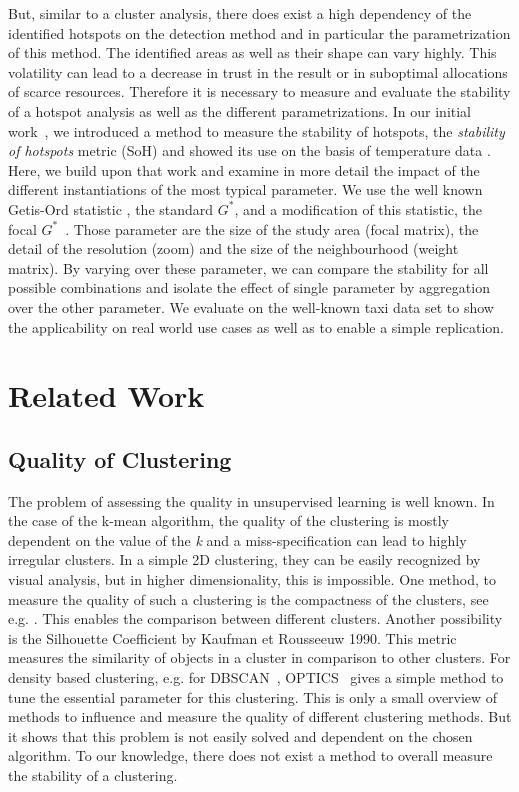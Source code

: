 \documentclass{itatnew}
\begin{document}
But, similar to a cluster analysis, there does exist a high dependency of the identified hotspots on the detection method and in particular the parametrization of this method. The identified areas as well as their shape can vary highly. This volatility can lead to a decrease in trust in the result or in suboptimal allocations of scarce resources. Therefore it is necessary to measure and evaluate the stability of a hotspot analysis as well as the different parametrizations. 
In our initial work~\cite{SoH-GI-Forum}, we introduced a method to measure the stability of hotspots, the \emph{stability of hotspots} metric (SoH) and showed its use on the basis of temperature data .   
Here, we build upon that work and examine in more detail the impact of the different instantiations of the most typical parameter. We use the well known Getis-Ord statistic \cite{Ord.1995}, the standard $G^*$, and a modification of this statistic, the focal $G^*$~\cite{SoH-GI-Forum}. Those parameter are the size of the study area (focal matrix), the detail of the resolution (zoom) and the size of the neighbourhood (weight matrix). By varying over these parameter, we can compare the stability for all possible combinations and isolate the effect of single parameter by aggregation over the other parameter. 
We evaluate on the well-known taxi data set to show the applicability on real world use cases as well as to enable a simple replication. 


\section{Related Work}

\subsection{Quality of Clustering}
The problem of assessing the quality in unsupervised learning is well known. In the case of the k-mean algorithm, the quality of the clustering is mostly dependent on the value of the \emph{k} and a miss-specification can lead to highly irregular clusters. In a simple 2D clustering, they can be easily recognized by visual analysis, but in higher dimensionality, this is impossible. One method, to measure the quality of such a clustering is the compactness of the clusters, see e.g. \cite{CompactnessDataClustering}. This enables the comparison between different clusters. Another possibility is the Silhouette Coefficient by Kaufman et Rousseeuw 1990. This metric measures the similarity of objects in a cluster in comparison to other clusters. For density based clustering, e.g. for DBSCAN~\cite{Ester96adensity-based}, OPTICS~\cite{Ankerst:1999:OOP:304181.304187} gives a simple method to tune the essential parameter for this clustering. This is only a small overview of methods to influence and measure the quality of different clustering methods. But it shows that this problem is not easily solved and dependent on the chosen algorithm. To our knowledge, there does not exist a method to overall measure the stability of a clustering.
\end{document}
